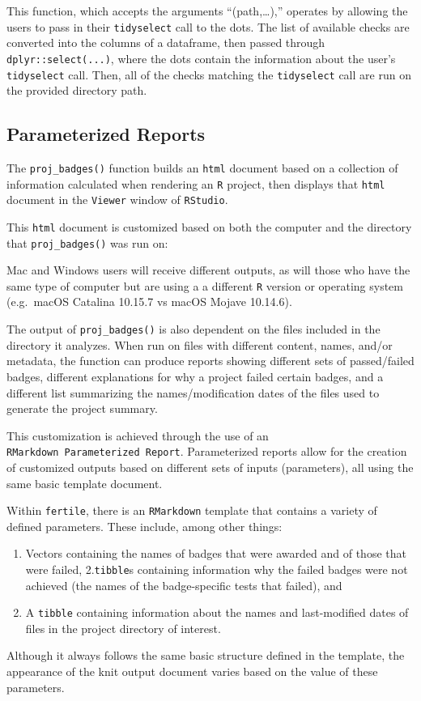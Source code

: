 \documentclass[12pt,twoside]{reedthesis}
\providecommand{\tightlist}{%
  \setlength{\itemsep}{0pt}\setlength{\parskip}{0pt}}
\begin{document}
This function, which accepts the arguments ``(path,\ldots),'' operates by allowing the users to pass in their \texttt{tidyselect} call to the dots. The list of available checks are converted into the columns of a dataframe, then passed through \texttt{dplyr::select(...)}, where the dots contain the information about the user's \texttt{tidyselect} call. Then, all of the checks matching the \texttt{tidyselect} call are run on the provided directory path.

\hypertarget{parameterized-reports}{%
\subsection{Parameterized Reports}\label{parameterized-reports}}

The \texttt{proj\_badges()} function builds an \texttt{html} document based on a collection of information calculated when rendering an \texttt{R} project, then displays that \texttt{html} document in the \texttt{Viewer} window of \texttt{RStudio}.

This \texttt{html} document is customized based on both the computer and the directory that \texttt{proj\_badges()} was run on:

Mac and Windows users will receive different outputs, as will those who have the same type of computer but are using a a different \texttt{R} version or operating system (e.g.~macOS Catalina 10.15.7 vs macOS Mojave 10.14.6).

The output of \texttt{proj\_badges()} is also dependent on the files included in the directory it analyzes. When run on files with different content, names, and/or metadata, the function can produce reports showing different sets of passed/failed badges, different explanations for why a project failed certain badges, and a different list summarizing the names/modification dates of the files used to generate the project summary.

This customization is achieved through the use of an \texttt{RMarkdown\ Parameterized\ Report}. Parameterized reports allow for the creation of customized outputs based on different sets of inputs (parameters), all using the same basic template document.

Within \texttt{fertile}, there is an \texttt{RMarkdown} template that contains a variety of defined parameters. These include, among other things:
\begin{enumerate}
\def\labelenumi{\arabic{enumi}.}
\tightlist
\item
  Vectors containing the names of badges that were awarded and of those that were failed,
  2.\texttt{tibble}s containing information why the failed badges were not achieved (the names of the badge-specific tests that failed), and
\item
  A \texttt{tibble} containing information about the names and last-modified dates of files in the project directory of interest.
\end{enumerate}
Although it always follows the same basic structure defined in the template, the appearance of the knit output document varies based on the value of these parameters.
\end{document}
